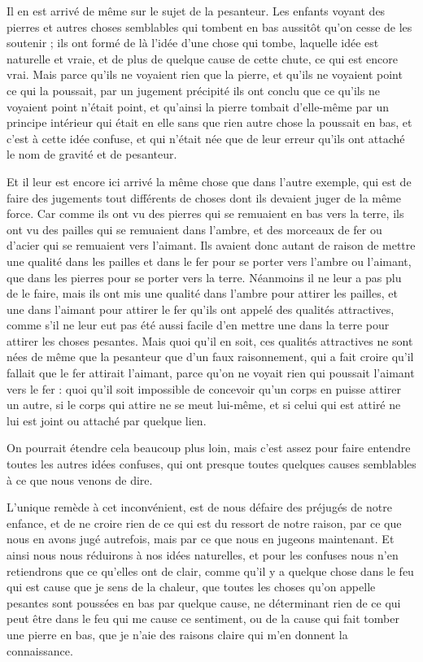 Il en est arrivé de même sur le sujet de la pesanteur. Les enfants voyant des pierres et autres choses semblables qui tombent en bas aussitôt qu'on cesse de les soutenir ; ils ont formé de là l'idée d'une chose qui tombe, laquelle idée est naturelle et vraie, et de plus de quelque cause de cette chute, ce qui est encore vrai. Mais parce qu'ils ne voyaient rien que la pierre, et qu'ils ne voyaient point ce qui la poussait, par un jugement précipité ils ont conclu que ce qu'ils ne voyaient point n'était point, et qu'ainsi la pierre tombait d'elle-même par un principe intérieur qui était en elle sans que rien autre chose la poussait en bas, et c'est à cette idée confuse, et qui n'était née que de leur erreur qu'ils ont attaché le nom de gravité et de pesanteur.

Et il leur est encore ici arrivé la même chose que dans l'autre exemple, qui est de faire des jugements tout différents de choses dont ils devaient juger de la même force. Car comme ils ont vu des pierres qui se remuaient en bas vers la terre, ils ont vu des pailles qui se remuaient dans l'ambre, et des morceaux de fer ou d'acier qui se remuaient vers l'aimant. Ils avaient donc autant de raison de mettre une qualité dans les pailles et dans le fer pour se porter vers l'ambre ou l'aimant, que dans les pierres pour se porter vers la terre. Néanmoins il ne leur a pas plu de le faire, mais ils ont mis une qualité dans l'ambre pour attirer les pailles, et une dans l'aimant pour attirer le fer qu'ils ont appelé des qualités attractives, comme s'il ne leur eut pas été aussi facile d'en mettre une dans la terre pour attirer les choses pesantes. Mais quoi qu'il en soit, ces qualités attractives ne sont nées de même que la pesanteur que d'un faux raisonnement, qui a fait croire qu'il fallait que le fer attirait l'aimant, parce qu'on ne voyait rien qui poussait l'aimant vers le fer : quoi qu'il soit impossible de concevoir qu'un corps en puisse attirer un autre, si le corps qui attire ne se meut lui-même, et si celui qui est attiré ne lui est joint ou attaché par quelque lien.

On pourrait étendre cela beaucoup plus loin, mais c'est assez pour faire entendre toutes les autres idées confuses, qui ont presque toutes quelques causes semblables à ce que nous venons de dire.

L'unique remède à cet inconvénient, est de nous défaire des préjugés de notre enfance, et de ne croire rien de ce qui est du ressort de notre raison, par ce que nous en avons jugé autrefois, mais par ce que nous en jugeons maintenant. Et ainsi nous nous réduirons à nos idées naturelles, et pour les confuses nous n'en retiendrons que ce qu'elles ont de clair, comme qu'il y a quelque chose dans le feu qui est cause que je sens de la chaleur, que toutes les choses qu'on appelle pesantes sont poussées en bas par quelque cause, ne déterminant rien de ce qui peut être dans le feu qui me cause ce sentiment, ou de la cause qui fait tomber une pierre en bas, que je n'aie des raisons claire qui m'en donnent la connaissance.

